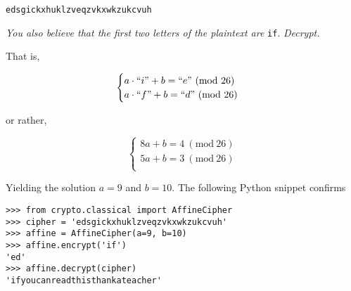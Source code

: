 \documentclass[12pt]{article}
\renewcommand{\mod}[1]{\mathrm{mod}\ #1}
\renewcommand{\pmod}[1]{\ (\mod{#1})}
\begin{document}
\begin{center}
\texttt{edsgickxhuklzveqzvkxwkzukcvuh}
\end{center}

\noindent\textit{You also believe that the first two letters of the plaintext are} \texttt{if}. \textit{Decrypt.}

That is,

$$\begin{cases}
a \cdot ``i" + b = ``e" \pmod{26}\\
a \cdot ``f" + b = ``d" \pmod{26}\\
\end{cases}$$

or rather,

$$\begin{cases}
8a + b = 4 \pmod{26}\\
5a + b = 3 \pmod{26}\\
\end{cases}$$

Yielding the solution $a = 9$ and $b = 10$. The following Python snippet confirms

\begin{verbatim}
>>> from crypto.classical import AffineCipher
>>> cipher = 'edsgickxhuklzveqzvkxwkzukcvuh'
>>> affine = AffineCipher(a=9, b=10)
>>> affine.encrypt('if')
'ed'
>>> affine.decrypt(cipher)
'ifyoucanreadthisthankateacher'
\end{verbatim}
\end{document}
